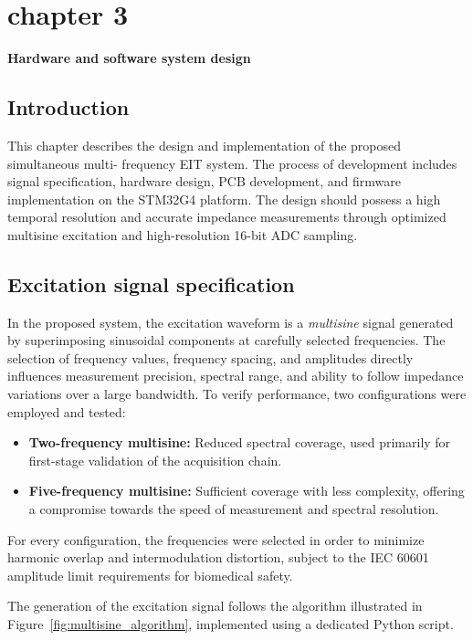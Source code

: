 \chapter*{chapter 3}

\textbf{\Huge Hardware and software system design} 

\setcounter{chapter}{3}
\setcounter{section}{0}


\section{Introduction}
This chapter describes the design and implementation of the proposed simultaneous multi-
frequency EIT system. The process of development includes signal specification, hardware
design, PCB development, and firmware implementation on the STM32G4 platform. The
design should possess a high temporal resolution and accurate impedance measurements
through optimized multisine excitation and high-resolution 16-bit ADC sampling.
\section{Excitation signal specification}
In the proposed system, the excitation waveform is a \textit{multisine} signal generated by superimposing sinusoidal components at carefully selected frequencies. The selection of frequency values, frequency spacing, and amplitudes directly influences measurement precision, spectral range, and ability to follow impedance variations over a large bandwidth.
To verify performance, two configurations were employed and tested:
\begin{itemize}
    \item \textbf{Two-frequency multisine:} Reduced spectral coverage, used primarily for first-stage validation of the acquisition chain.
\item \textbf{Five-frequency multisine:} Sufficient coverage with less complexity, offering a compromise
towards the speed of measurement and spectral resolution.
\end{itemize}
For every configuration, the frequencies were selected in order to minimize harmonic overlap and intermodulation distortion, subject to the IEC 60601 amplitude limit requirements for biomedical safety.


\noindent
The generation of the excitation signal follows the algorithm illustrated in Figure~\ref{fig:multisine_algorithm}, implemented using a dedicated Python script.

